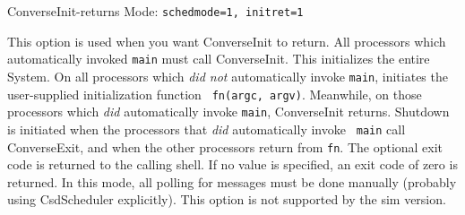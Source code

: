 ConverseInit-returns Mode: {\tt schedmode=1, initret=1}

This option is used when you want ConverseInit to return.  All
processors which automatically invoked {\tt main} must call
ConverseInit.  This initializes the entire \converse{} System.  On all
processors which {\em did not} automatically invoke {\tt main},
\converse{} initiates the user-supplied initialization function {\tt
fn(argc, argv)}.  Meanwhile, on those processors which {\em did}
automatically invoke {\tt main}, ConverseInit returns.  Shutdown is
initiated when the processors that {\em did} automatically invoke {\tt
main} call ConverseExit, and when the other processors return from
{\tt fn}.  The optional exit code is returned to the calling shell.
If no value is specified, an exit code of zero is returned.
In this mode, all polling for messages must be done
manually (probably using CsdScheduler explicitly).  This option is not
supported by the sim version.




